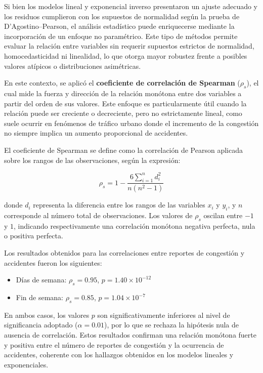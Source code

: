 \documentclass[12pt]{article}
\begin{document}
Si bien los modelos lineal y exponencial inverso presentaron un ajuste adecuado y los residuos cumplieron con los supuestos de normalidad según la prueba de D’Agostino–Pearson, el análisis estadístico puede enriquecerse mediante la incorporación de un enfoque no paramétrico. Este tipo de métodos permite evaluar la relación entre variables sin requerir supuestos estrictos de normalidad, homocedasticidad ni linealidad, lo que otorga mayor robustez frente a posibles valores atípicos o distribuciones asimétricas.

En este contexto, se aplicó el \textbf{coeficiente de correlación de Spearman} ($\rho_s$), el cual mide la fuerza y dirección de la relación monótona entre dos variables a partir del orden de sus valores. Este enfoque es particularmente útil cuando la relación puede ser creciente o decreciente, pero no estrictamente lineal, como suele ocurrir en fenómenos de tráfico urbano donde el incremento de la congestión no siempre implica un aumento proporcional de accidentes.

El coeficiente de Spearman se define como la correlación de Pearson aplicada sobre los rangos de las observaciones, según la expresión:

\begin{equation}
\rho_s = 1 - \frac{6 \sum_{i=1}^{n} d_i^2}{n(n^2 - 1)}
\end{equation}

donde $d_i$ representa la diferencia entre los rangos de las variables $x_i$ y $y_i$, y $n$ corresponde al número total de observaciones. Los valores de $\rho_s$ oscilan entre $-1$ y $1$, indicando respectivamente una correlación monótona negativa perfecta, nula o positiva perfecta.

Los resultados obtenidos para las correlaciones entre reportes de congestión y accidentes fueron los siguientes:

\begin{itemize}
    \item Días de semana: $\rho_s = 0.95$, $p = 1.40 \times 10^{-12}$
    \item Fin de semana: $\rho_s = 0.85$, $p = 1.04 \times 10^{-7}$
\end{itemize}

En ambos casos, los valores $p$ son significativamente inferiores al nivel de significancia adoptado ($\alpha = 0.01$), por lo que se rechaza la hipótesis nula de ausencia de correlación. Estos resultados confirman una relación monótona fuerte y positiva entre el número de reportes de congestión y la ocurrencia de accidentes, coherente con los hallazgos obtenidos en los modelos lineales y exponenciales.
\end{document}

